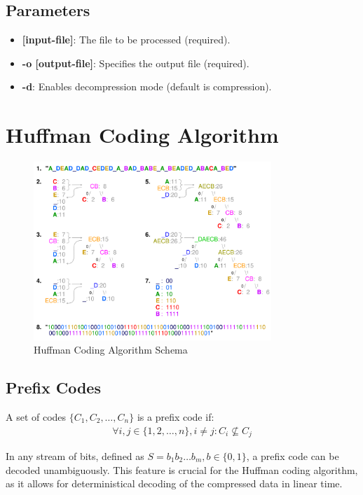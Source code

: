 \documentclass{article}
\begin{document}
\subsection{Parameters}
\begin{itemize}
    \item \textbf{[input-file]}: The file to be processed (required).
    \item \textbf{-o [output-file]}: Specifies the output file (required).
    \item \textbf{-d}: Enables decompression mode (default is compression).
\end{itemize}

\section{Huffman Coding Algorithm}

\begin{figure}[H]
    \centering
    \includegraphics[width=0.8\textwidth]{schema.png}
    \caption{Huffman Coding Algorithm Schema}
    \label{fig:huffman-schema}
\end{figure}

\subsection{Prefix Codes}

A set of codes $\{C_1, C_2, \ldots, C_n\}$ is a prefix code if:
\begin{align}
    \forall i, j \in \{1, 2, \ldots, n\}, i \neq j: C_i \not\subseteq C_j
\end{align}

\noindent
In any stream of bits, defined as $S = b_1 b_2 \ldots b_m, b\in\{0,1\}$, 
a prefix code can be decoded unambiguously. This feature is crucial for 
the Huffman coding algorithm, as it allows for deterministical decoding
of the compressed data in linear time.
\end{document}
